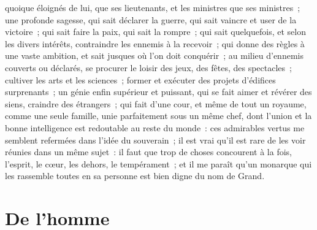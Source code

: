 \documentclass[french,twoside]{book} %
\newcommand\chapteropen{} %
\newcommand\chapterclose{} %
\begin{document}
quoique éloignés de lui, que ses lieutenants, et les ministres que ses ministres ; une profonde sagesse, qui sait déclarer la guerre, qui sait vaincre et user de la victoire ; qui sait faire la paix, qui sait la rompre ; qui sait quelquefois, et selon les divers intérêts, contraindre les ennemis à la recevoir ; qui donne des règles à une vaste ambition, et sait jusques où l’on doit conquérir ; au milieu d’ennemis couverts ou déclarés, se procurer le loisir des jeux, des fêtes, des spectacles ; cultiver les arts et les sciences ; former et exécuter des projets d’édifices surprenants ; un génie enfin supérieur et puissant, qui se fait aimer et révérer des siens, craindre des étrangers ; qui fait d’une cour, et même de tout un royaume, comme une seule famille, unie parfaitement sous un même chef, dont l’union et la bonne intelligence est redoutable au reste du monde : ces admirables vertus me semblent refermées dans l’idée du souverain ; il est vrai qu’il est rare de les voir réunies dans un même sujet : il faut que trop de choses concourent à la fois, l’esprit, le cœur, les dehors, le tempérament ; et il me paraît qu’un monarque qui les rassemble toutes en sa personne est bien digne du nom de Grand.
\chapterclose


\chapteropen
\chapter[{De l’homme}]{De l’homme}
\label{lb-homme}\renewcommand{\leftmark}{De l’homme}
\end{document}
